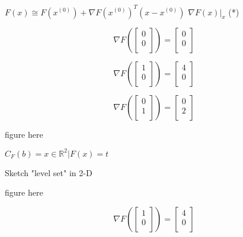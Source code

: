 $F(x) \cong F(x^{(0)}) + \nabla F(x^{(0)})^{T} (x - x^{(0)})$
$\left. \nabla F(x) \right|_{x}$
(*)

\begin{displaymath}
\nabla F \left( \begin{bmatrix} 0\\ 0\\ \end{bmatrix} \right)  =
\begin{bmatrix} 0\\ 0\\ \end{bmatrix}
\end{displaymath}

\begin{displaymath}
\nabla F \left( \begin{bmatrix} 1\\ 0\\ \end{bmatrix} \right)  =
\begin{bmatrix} 4\\ 0\\ \end{bmatrix}
\end{displaymath}

\begin{displaymath}
\nabla F \left( \begin{bmatrix} 0\\ 1\\ \end{bmatrix} \right)  =
\begin{bmatrix} 0\\ 2\\ \end{bmatrix}
\end{displaymath}

figure here

$C_F(b) = {x \in \mathbb{R}^2 | F(x) = t}$


Sketch "level set" in 2-D

figure here

\begin{displaymath}
\nabla F \left( \begin{bmatrix} 1\\ 0\\ \end{bmatrix} \right)  =
\begin{bmatrix} 4\\ 0\\ \end{bmatrix}
\end{displaymath}

